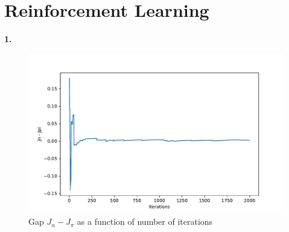 \documentclass[11pt, oneside]{article}   	%
\begin{document}
\section{Reinforcement Learning}
\textbf{1.}
\begin{figure}[h!]
\begin{center}
\includegraphics[width=.8\linewidth]{monte_carlo.pdf}
\caption{Gap $J_n - J_{\pi}$ as a function of number of iterations}
\label{default}
\end{center}
\end{figure}
\end{document}
